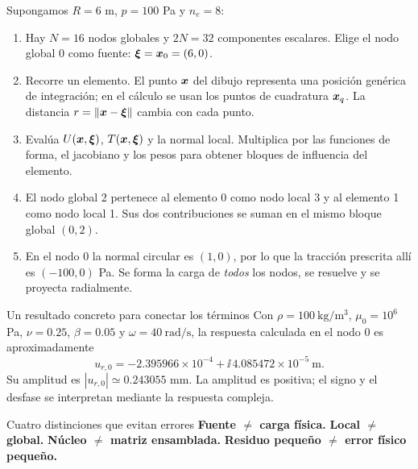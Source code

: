 \documentclass[11pt]{article}
\begin{document}
Supongamos \(R=6\) m, \(p=100\) Pa y \(n_e=8\):
\begin{enumerate}
 \item Hay \(N=16\) nodos globales y \(2N=32\) componentes escalares.
 Elige el nodo global 0 como fuente: \(\bm{\xi}=\bm{x}_0=(6,0)\).
 \item Recorre un elemento. El punto \(\bm{x}\) del dibujo representa
 una posición genérica de integración; en el cálculo se usan los puntos
 de cuadratura \(\bm{x}_q\). La distancia \(r=\left\lVert\bm{x}-\bm{\xi}\right\rVert\)
 cambia con cada punto.
 \item Evalúa \(U(\bm{x},\bm{\xi})\), \(T(\bm{x},\bm{\xi})\) y la normal
 local. Multiplica por las funciones de forma, el jacobiano y los pesos
 para obtener bloques de influencia del elemento.
 \item El nodo global 2 pertenece al elemento 0 como nodo local 3 y al
 elemento 1 como nodo local 1. Sus dos contribuciones se suman en el
 mismo bloque global \((0,2)\).
 \item En el nodo 0 la normal circular es \((1,0)\), por lo que la
 tracción prescrita allí es \((-100,0)\) Pa. Se forma la carga de
 \emph{todos} los nodos, se resuelve y se proyecta radialmente.
\end{enumerate}

\begin{resultado}{Un resultado concreto para conectar los términos}
Con \(\rho=100\ \mathrm{kg/m^3}\), \(\mu_0=10^6\) Pa, \(\nu=0.25\),
\(\beta=0.05\) y \(\omega=40\ \mathrm{rad/s}\), la respuesta calculada
en el nodo 0 es aproximadamente
\[
 u_{r,0}=-2.395966\times10^{-4}
          +\ii\,4.085472\times10^{-5}\ \mathrm m.
\]
Su amplitud es \(|u_{r,0}|\simeq0.243055\) mm. La amplitud es positiva;
el signo y el desfase se interpretan mediante la respuesta compleja.
\end{resultado}

\begin{alerta}{Cuatro distinciones que evitan errores}
\textbf{Fuente \(\ne\) carga física.}
\textbf{Local \(\ne\) global.}
\textbf{Núcleo \(\ne\) matriz ensamblada.}
\textbf{Residuo pequeño \(\ne\) error físico pequeño.}
\end{alerta}

\newpage
\end{document}
